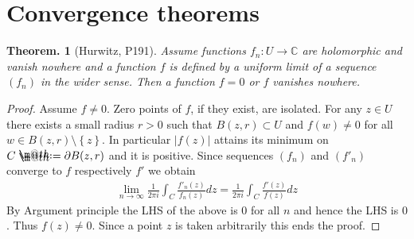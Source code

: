 \documentclass[openany, a4paper, oneside]{jsbook}
\makeatletter
\newcommand*{\defeq}{\mathrel{\rlap{%
\raisebox{0.3ex}{$\m@th\cdot$}}%
\raisebox{-0.3ex}{$\m@th\cdot$}}%
=}
\theoremstyle{break}
\newtheorem{thm}{Theorem.}[section]
\theoremstyle{breakdefn}
\newcommand{\abs}[1]{\left|#1\right|}
\newcommand{\cbk}[1]{\left\{#1\right\}}
\newcommand{\bbC}{\mathbb{C}}
\makeatother
\begin{document}
\section{Convergence theorems}


\begin{thm}[Hurwitz, \cite{LarsAhlfors1} P191]
 Assume functions $f_n \colon U \to \bbC$ are holomorphic and vanish nowhere
 and a function $f$ is defined by a uniform limit of a sequence $(f_n)$ in the wider sense.
 Then a function $f = 0$ or $f$ vanishes nowhere.
\end{thm}
\begin{proof}
 Assume $f \neq 0$.
 Zero points of $f$, if they exist, are isolated.
 For any $z \in U$ there exists a small radius $r>0$ such that $B (z, r) \subset U$ and $f (w) \neq 0$ for all $w \in B (z, r) \setminus \cbk{z}$.
 In particular $\abs{f (z)}$ attains its minimum on $C \defeq \partial B (z, r)$ and it is positive.
 Since sequences $(f_n)$ and $(f'_n)$ converge to $f$ respectively $f'$ we obtain
 \begin{align}
  \lim_{n \to \infty} \frac{1}{2 \pi i} \int_C \frac{f'_n (z)}{f_n (z)} dz
  =
  \frac{1}{2 \pi i} \int_C \frac{f' (z)}{f (z)} dz
 \end{align}
 By Argument principle the LHS of the above is $0$ for all $n$ and hence the LHS is $0$.
 Thus $f (z) \neq 0$.
 Since a point $z$ is taken arbitrarily this ends the proof.
\end{proof}
\end{document}

